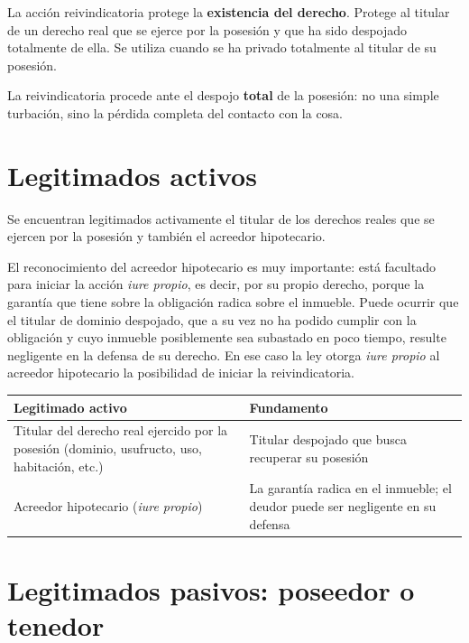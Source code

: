 \documentclass[12pt,oneside]{book}
\begin{document}
La acción reivindicatoria protege la \textbf{existencia del derecho}. Protege al titular de un derecho real que se ejerce por la posesión y que ha sido despojado totalmente de ella. Se utiliza cuando se ha privado totalmente al titular de su posesión.

\begin{important}
La reivindicatoria procede ante el despojo \textbf{total} de la posesión: no una simple turbación, sino la pérdida completa del contacto con la cosa.
\end{important}

\section{Legitimados activos}

Se encuentran legitimados activamente el titular de los derechos reales que se ejercen por la posesión y también el acreedor hipotecario.

El reconocimiento del acreedor hipotecario es muy importante: está facultado para iniciar la acción \textit{iure propio}, es decir, por su propio derecho, porque la garantía que tiene sobre la obligación radica sobre el inmueble. Puede ocurrir que el titular de dominio despojado, que a su vez no ha podido cumplir con la obligación y cuyo inmueble posiblemente sea subastado en poco tiempo, resulte negligente en la defensa de su derecho. En ese caso la ley otorga \textit{iure propio} al acreedor hipotecario la posibilidad de iniciar la reivindicatoria.

\begin{table}[H]
\centering
\begin{tabularx}{\textwidth}{
    >{\raggedright\arraybackslash}X
    >{\raggedright\arraybackslash}X
}
\toprule
\textbf{Legitimado activo} & \textbf{Fundamento} \\
\midrule
Titular del derecho real ejercido por la posesión (dominio, usufructo, uso, habitación, etc.) & Titular despojado que busca recuperar su posesión \\
Acreedor hipotecario (\textit{iure propio}) & La garantía radica en el inmueble; el deudor puede ser negligente en su defensa \\
\bottomrule
\end{tabularx}
\end{table}

\section{Legitimados pasivos: poseedor o tenedor}
\end{document}
